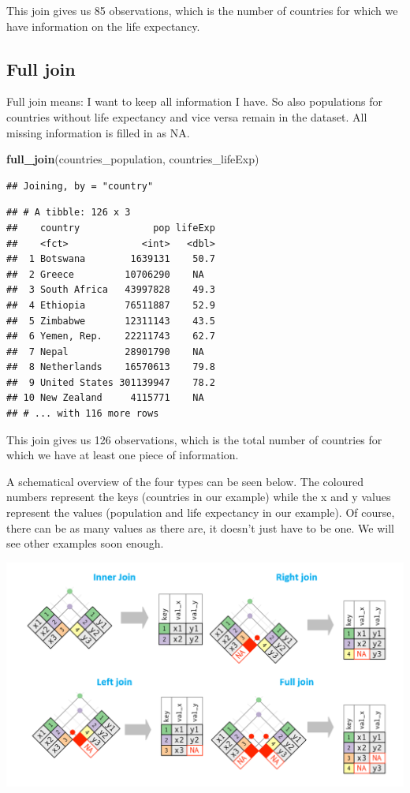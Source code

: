 \documentclass[]{tufte-book}
\newenvironment{Shaded}{}{}
\newcommand{\KeywordTok}[1]{\textcolor[rgb]{0.00,0.44,0.13}{\textbf{#1}}}
\newcommand{\NormalTok}[1]{#1}
\begin{document}
This join gives us 85 observations, which is the number of countries for which we have information on the life expectancy.

\hypertarget{full-join}{%
\subsection{Full join}\label{full-join}}

Full join means: I want to keep all information I have. So also populations for countries without life expectancy and vice versa remain in the dataset. All missing information is filled in as NA.

\begin{Shaded}
\begin{Highlighting}[]
\KeywordTok{full_join}\NormalTok{(countries_population, countries_lifeExp)}
\end{Highlighting}
\end{Shaded}

\begin{verbatim}
## Joining, by = "country"
\end{verbatim}

\begin{verbatim}
## # A tibble: 126 x 3
##    country             pop lifeExp
##    <fct>             <int>   <dbl>
##  1 Botswana        1639131    50.7
##  2 Greece         10706290    NA  
##  3 South Africa   43997828    49.3
##  4 Ethiopia       76511887    52.9
##  5 Zimbabwe       12311143    43.5
##  6 Yemen, Rep.    22211743    62.7
##  7 Nepal          28901790    NA  
##  8 Netherlands    16570613    79.8
##  9 United States 301139947    78.2
## 10 New Zealand     4115771    NA  
## # ... with 116 more rows
\end{verbatim}

This join gives us 126 observations, which is the total number of countries for which we have at least one piece of information.

A schematical overview of the four types can be seen below. The coloured numbers represent the keys (countries in our example) while the x and y values represent the values (population and life expectancy in our example). Of course, there can be as many values as there are, it doesn't just have to be one. We will see other examples soon enough.

\includegraphics[width=1\linewidth]{images/join_types}
\end{document}
